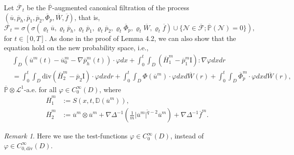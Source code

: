 \documentclass[reqno]{amsart}
\theoremstyle{definition}
\theoremstyle{remark}
\newtheorem{Remark}{Remark}[section]
\numberwithin{equation}{section} \allowdisplaybreaks
\begin{document}
Let $\overline{\mathscr{F}}_t$ be the
$\overline{\mathbb{P}}$-augmented canonical filtration of the
process
$(\overline{u},\overline{p}_h,\overline{p}_1,\overline{p}_2,\overline{\Phi}_p,\overline{W},\overline{f})$,
that is,
$$\overline{\mathscr{F}_t}=\sigma(\sigma(\varrho_t\overline{u},\varrho_t\overline{p}_h,\varrho_t\overline{p}_1,\varrho_t\overline{p}_2,\varrho_t\overline{\Phi}_p,
\varrho_t\overline{W},\varrho_t\overline{f})\cup\{\mathcal{N}\in\overline{\mathscr{F}};\overline{\mathbb{P}}(\mathcal{N})=0\}),$$
for $t\in [0,T]$. As done in the proof of Lemma 4.2, we can also
show that the equation hold on the new probability space, i.e.,
\begin{equation*}
\begin{split}
&\int_{D}(\overline{u}^m(t)-\overline{u}^m_0-\nabla \overline{p}^m_h(t))\cdot\varphi dx+\int_0^t\!\!\!\int_{D}(\overline{H}_1^m-\overline{p}_1^m\textrm{I}):\nabla\varphi dxdr\\
&=\int_0^t\!\!\!\int_{D}\text{div}(\overline{H}_2^m-\overline{p}_2\textrm{I})\cdot\varphi
dxdr+\int_0^t\!\!\!\int_{D}\Phi(\overline{u}^m)\cdot\varphi
dxd\overline{W}(r)+\int_0^t\!\!\!\int_{D}\overline{\Phi}_p^m\cdot\varphi
 dxd\overline{W}(r),
\end{split}
\end{equation*}
$\overline{\mathbb{P}}\otimes \mathcal{L}^1$-a.e. for all
$\varphi\in C_0^\infty(D)$, where
\begin{align*}
\overline{H}_1^m&:=S(x,t,\mathbb{D}(\overline{u}^m)),\\
\overline{H}_2^m&:=\overline{u}^m\otimes
\overline{u}^m+\nabla\Delta^{-1}\left(\frac{1}{m}|\overline{u}^m|^{\tilde{q}-2}\overline{u}^m\right)
+\nabla\Delta^{-1}\overline{f}^m.
\end{align*}
\begin{Remark}
Here we use the test-functions $\varphi\in C_0^\infty(D)$, instead
of $\varphi\in C_{0,\text{div}}^\infty(D)$.
\end{Remark}
\end{document}
